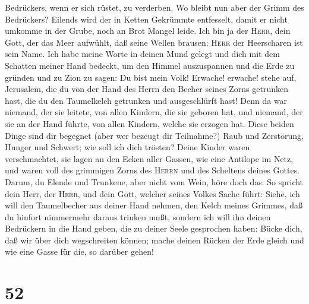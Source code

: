 Bedrückers, wenn er sich rüstet, zu verderben. Wo bleibt nun aber der
Grimm des Bedrückers?  Eilends wird der in Ketten
Gekrümmte entfesselt, damit er nicht umkomme in der Grube, noch an Brot
Mangel leide.  Ich bin ja der \textsc{Herr}, dein Gott,
der das Meer aufwühlt, daß seine Wellen brausen: \textsc{Herr} der
Heerscharen ist sein Name.  Ich habe meine Worte in
deinen Mund gelegt und dich mit dem Schatten meiner Hand bedeckt, um den
Himmel auszuspannen und die Erde zu gründen und zu Zion zu sagen: Du
bist mein Volk!  Erwache! erwache! stehe auf, Jerusalem,
die du von der Hand des Herrn den Becher seines Zorns getrunken hast,
die du den Taumelkelch getrunken und ausgeschlürft hast! 
Denn da war niemand, der sie leitete, von allen Kindern, die sie geboren
hat, und niemand, der sie an der Hand führte, von allen Kindern, welche
sie erzogen hat.  Diese beiden Dinge sind dir begegnet
(aber wer bezeugt dir Teilnahme?) Raub und Zerstörung, Hunger und
Schwert; wie soll ich dich trösten?  Deine Kinder waren
verschmachtet, sie lagen an den Ecken aller Gassen, wie eine Antilope im
Netz, und waren voll des grimmigen Zorns des \textsc{Herrn} und des
Scheltens deines Gottes.  Darum, du Elende und Trunkene,
aber nicht vom Wein, höre doch das:  So spricht dein
Herr, der \textsc{Herr}, und dein Gott, welcher seines Volkes Sache
führt: Siehe, ich will den Taumelbecher aus deiner Hand nehmen, den
Kelch meines Grimmes, daß du hinfort nimmermehr daraus trinken mußt,
 sondern ich will ihn deinen Bedrückern in die Hand
geben, die zu deiner Seele gesprochen haben: Bücke dich, daß wir über
dich wegschreiten können; mache deinen Rücken der Erde gleich und wie
eine Gasse für die, so darüber gehen!

\hypertarget{section-51}{%
\section{52}\label{section-51}}


